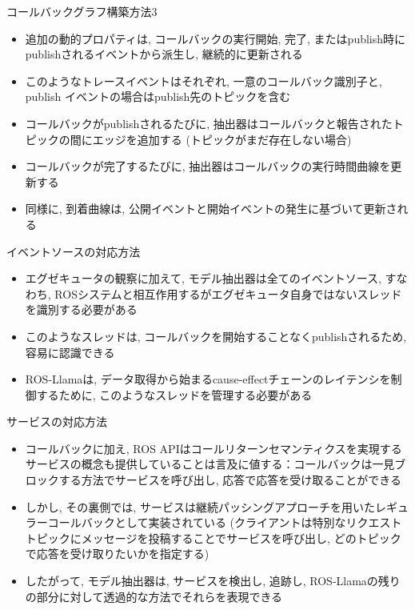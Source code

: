 \begin{frame}{コールバックグラフ構築方法3}
    \begin{itemize}
        \item 追加の動的プロパティは, コールバックの実行開始, 完了, またはpublish時にpublishされるイベントから派生し, 継続的に更新される
        \item このようなトレースイベントはそれぞれ, 一意のコールバック識別子と, publish イベントの場合はpublish先のトピックを含む
        \item コールバックがpublishされるたびに, 抽出器はコールバックと報告されたトピックの間にエッジを追加する (トピックがまだ存在しない場合)
        \item コールバックが完了するたびに, 抽出器はコールバックの実行時間曲線を更新する
        \item 同様に, 到着曲線は, 公開イベントと開始イベントの発生に基づいて更新される
    \end{itemize}
\end{frame}

\begin{frame}{イベントソースの対応方法}
    \begin{itemize}
        \item エグゼキュータの観察に加えて, モデル抽出器は全てのイベントソース, すなわち, ROSシステムと相互作用するがエグゼキュータ自身ではないスレッドを識別する必要がある
        \item このようなスレッドは, コールバックを開始することなくpublishされるため, 容易に認識できる
        \item ROS-Llamaは, データ取得から始まるcause-effectチェーンのレイテンシを制御するために, このようなスレッドを管理する必要がある
    \end{itemize}
\end{frame}

\begin{frame}{サービスの対応方法}
    \begin{itemize}
        \item コールバックに加え, ROS APIはコールリターンセマンティクスを実現するサービスの概念も提供していることは言及に値する：コールバックは一見ブロックする方法でサービスを呼び出し, 応答で応答を受け取ることができる
        \item しかし, その裏側では, サービスは継続パッシングアプローチを用いたレギュラーコールバックとして実装されている (クライアントは特別なリクエストトピックにメッセージを投稿することでサービスを呼び出し, どのトピックで応答を受け取りたいかを指定する)
        \item したがって, モデル抽出器は, サービスを検出し, 追跡し, ROS-Llamaの残りの部分に対して透過的な方法でそれらを表現できる
    \end{itemize}
\end{frame}

